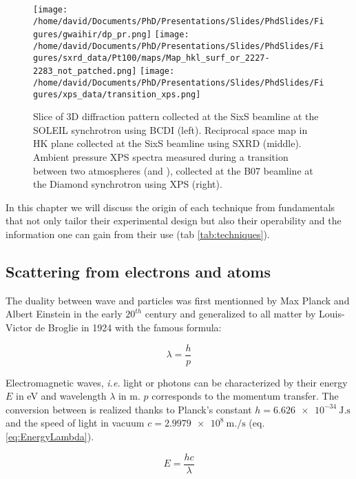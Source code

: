 \begin{figure}[!htb]
    \centering
    \texttt{[image: /home/david/Documents/PhD/Presentations/Slides/PhdSlides/Figures/gwaihir/dp\_pr.png]}
    \texttt{[image: /home/david/Documents/PhD/Presentations/Slides/PhdSlides/Figures/sxrd\_data/Pt100/maps/Map\_hkl\_surf\_or\_2227-2283\_not\_patched.png]}
    \texttt{[image: /home/david/Documents/PhD/Presentations/Slides/PhdSlides/Figures/xps\_data/transition\_xps.png]}
    \caption{
    Slice of 3D diffraction pattern collected at the SixS beamline at the SOLEIL synchrotron using BCDI (left).
    Reciprocal space map in HK plane collected at the SixS beamline using SXRD (middle).
    Ambient pressure XPS spectra measured during a transition between two atmospheres (\argon  and \dioxygen), collected at the B07 beamline at the Diamond synchrotron using XPS (right).}
    \label{fig:TechniquesDataExamples}
\end{figure}

In this chapter we will discuss the origin of each technique from fundamentals that not only tailor their experimental design but also their operability and the information one can gain from their use (tab \ref{tab:techniques}).

\subsection{Scattering from electrons and atoms}

The duality between wave and particles was first mentionned by Max Planck and Albert Einstein in the early $20^{th}$ century and generalized to all matter by Louis-Victor de Broglie in 1924 with the famous formula:

\begin{equation}
	\lambda = \frac{h}{p}
\end{equation}

Electromagnetic waves, \textit{i.e.} light or photons can be characterized by their energy $E$ in \unit{\eV} and wavelength $\lambda$ in \unit{\meter}. $p$ corresponds to the momentum transfer.
The conversion between is realized thanks to Planck's constant $h = \qty{6.626e-34}{\joule.\second}$ and the speed of light in vacuum $c = \qty{2.9979e8}{\meter.\per \second}$ (eq. \ref{eq:EnergyLambda}).

\begin{equation}
    \label{eq:EnergyLambda}
	E = \frac{hc}{\lambda}
\end{equation}

